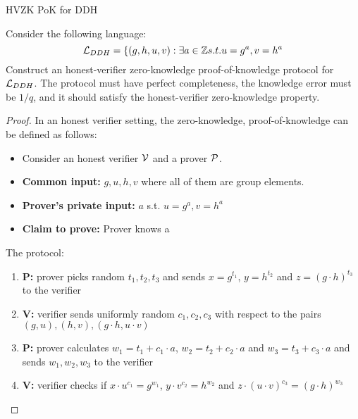 \begin{solution}{HVZK PoK for DDH}\label{ques:2.2}
    \begin{question}
    Consider the following language:
    \begin{equation}
        \mathcal{L}_{DDH} = \{(g,h,u,v): \exists a \in \mathbb{Z} s.t. u = g^a , v = h^a
    \end{equation}
    Construct an honest-verifier zero-knowledge proof-of-knowledge protocol for $\mathcal{L}_{DDH}$. The protocol must have perfect completeness, the knowledge error must be $1/q$, and it should satisfy the honest-verifier zero-knowledge property.
    \end{question}
    \tcblower{}
    \begin{proof}
    In an honest verifier setting, the zero-knowledge, proof-of-knowledge can be defined as follows: 
    \begin{itemize}
        \item Consider an honest verifier $\mathcal{V}$ and a prover $\mathcal{P}$.
        \item \textbf{Common input:} $g, u, h, v$ where all of them are group elements.
        \item \textbf{Prover's private input:} $a$ s.t. $u = g^a , v = h^a$
        \item \textbf{Claim to prove:} Prover knows a
    \end{itemize}

    The protocol:
    \begin{enumerate}
        \item \textbf{P:} prover picks random $t_1, t_2, t_3$ and sends $x = g^{t_1}$, $y = h^{t_2}$ and $z = (g \cdot h)^{t_3}$ to the verifier
        \item \textbf{V:} verifier sends uniformly random $c_1, c_2, c_3$ with respect to the pairs $(g,u),(h,v),(g \cdot h,u \cdot v)$
        \item \textbf{P:} prover calculates $w_1 = t_1 +c_1\cdot a$, $w_2 = t_2 +c_2\cdot a$ and $w_3 = t_3 +c_3\cdot a$ and sends $w_1, w_2, w_3$ to the verifier
        \item \textbf{V:} verifier checks if $x \cdot u^{c_1} = g^{w_1}$, $y \cdot v^{c_2} = h^{w_2}$ and $z \cdot (u \cdot v)^{c_3} = (g \cdot h)^{w_3}$
    \end{enumerate}
    \end{proof}
\end{solution}
